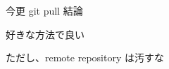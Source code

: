 \begin{frame}[t]{今更 git pull}{}
  結論
  \vspace{4ex}

  好きな方法で良い
  \vspace{2ex}

  ただし、remote repository は汚すな
\end{frame}
